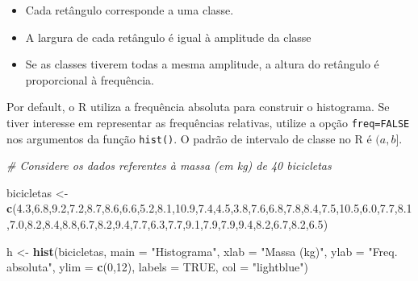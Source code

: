 \documentclass[
]{book}
\newenvironment{Shaded}{\begin{snugshade}}{\end{snugshade}}
\newcommand{\AttributeTok}[1]{\textcolor[rgb]{0.13,0.29,0.53}{#1}}
\newcommand{\CommentTok}[1]{\textcolor[rgb]{0.56,0.35,0.01}{\textit{#1}}}
\newcommand{\ConstantTok}[1]{\textcolor[rgb]{0.56,0.35,0.01}{#1}}
\newcommand{\DecValTok}[1]{\textcolor[rgb]{0.00,0.00,0.81}{#1}}
\newcommand{\FloatTok}[1]{\textcolor[rgb]{0.00,0.00,0.81}{#1}}
\newcommand{\FunctionTok}[1]{\textcolor[rgb]{0.13,0.29,0.53}{\textbf{#1}}}
\newcommand{\NormalTok}[1]{#1}
\newcommand{\OtherTok}[1]{\textcolor[rgb]{0.56,0.35,0.01}{#1}}
\newcommand{\StringTok}[1]{\textcolor[rgb]{0.31,0.60,0.02}{#1}}
\theoremstyle{definition}
\theoremstyle{definition}
\theoremstyle{definition}
\theoremstyle{definition}
\theoremstyle{remark}
\begin{document}
\begin{itemize}
\item
  Cada retângulo corresponde a uma classe.
\item
  A largura de cada retângulo é igual à amplitude da classe
\item
  Se as classes tiverem todas a mesma amplitude, a altura do retângulo é proporcional à frequência.
\end{itemize}

Por default, o R utiliza a frequência absoluta para construir o histograma. Se tiver interesse em representar as frequências relativas, utilize a opção \texttt{freq=FALSE} nos argumentos da função \texttt{hist()}. O padrão de intervalo de classe no R é \((a, b]\).

\begin{Shaded}
\begin{Highlighting}[]
\CommentTok{\# Considere os dados referentes à massa (em kg) de 40 bicicletas}

\NormalTok{bicicletas }\OtherTok{\textless{}{-}} \FunctionTok{c}\NormalTok{(}\FloatTok{4.3}\NormalTok{,}\FloatTok{6.8}\NormalTok{,}\FloatTok{9.2}\NormalTok{,}\FloatTok{7.2}\NormalTok{,}\FloatTok{8.7}\NormalTok{,}\FloatTok{8.6}\NormalTok{,}\FloatTok{6.6}\NormalTok{,}\FloatTok{5.2}\NormalTok{,}\FloatTok{8.1}\NormalTok{,}\FloatTok{10.9}\NormalTok{,}\FloatTok{7.4}\NormalTok{,}\FloatTok{4.5}\NormalTok{,}\FloatTok{3.8}\NormalTok{,}\FloatTok{7.6}\NormalTok{,}\FloatTok{6.8}\NormalTok{,}\FloatTok{7.8}\NormalTok{,}\FloatTok{8.4}\NormalTok{,}\FloatTok{7.5}\NormalTok{,}\FloatTok{10.5}\NormalTok{,}\FloatTok{6.0}\NormalTok{,}\FloatTok{7.7}\NormalTok{,}\FloatTok{8.1}\NormalTok{,}\FloatTok{7.0}\NormalTok{,}\FloatTok{8.2}\NormalTok{,}\FloatTok{8.4}\NormalTok{,}\FloatTok{8.8}\NormalTok{,}\FloatTok{6.7}\NormalTok{,}\FloatTok{8.2}\NormalTok{,}\FloatTok{9.4}\NormalTok{,}\FloatTok{7.7}\NormalTok{,}\FloatTok{6.3}\NormalTok{,}\FloatTok{7.7}\NormalTok{,}\FloatTok{9.1}\NormalTok{,}\FloatTok{7.9}\NormalTok{,}\FloatTok{7.9}\NormalTok{,}\FloatTok{9.4}\NormalTok{,}\FloatTok{8.2}\NormalTok{,}\FloatTok{6.7}\NormalTok{,}\FloatTok{8.2}\NormalTok{,}\FloatTok{6.5}\NormalTok{)}
  
\NormalTok{h }\OtherTok{\textless{}{-}} \FunctionTok{hist}\NormalTok{(bicicletas,     }
  \AttributeTok{main =} \StringTok{"Histograma"}\NormalTok{,     }
  \AttributeTok{xlab =} \StringTok{"Massa (kg)"}\NormalTok{,     }
  \AttributeTok{ylab =} \StringTok{"Freq. absoluta"}\NormalTok{,     }
  \AttributeTok{ylim =} \FunctionTok{c}\NormalTok{(}\DecValTok{0}\NormalTok{,}\DecValTok{12}\NormalTok{),     }
  \AttributeTok{labels =} \ConstantTok{TRUE}\NormalTok{,     }
  \AttributeTok{col =} \StringTok{"lightblue"}\NormalTok{)}
\end{Highlighting}
\end{Shaded}
\end{document}
